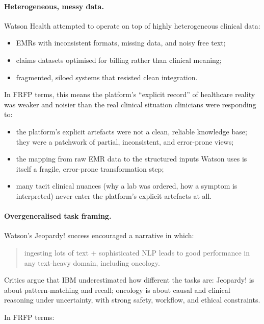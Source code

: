 \paragraph{Heterogeneous, messy data.}
Watson Health attempted to operate on top of highly heterogeneous clinical
data:

\begin{itemize}
  \item EMRs with inconsistent formats, missing data, and noisy free text;
  \item claims datasets optimised for billing rather than clinical meaning;
  \item fragmented, siloed systems that resisted clean integration.
\end{itemize}

In FRFP terms, this means the platform’s “explicit record” of healthcare reality was weaker and noisier than the real clinical situation clinicians were responding to:

\begin{itemize}
\item the platform’s explicit artefacts were not a clean, reliable knowledge base; they were
        a patchwork of partial, inconsistent, and error-prone views;
  \item the mapping from raw EMR data to the structured inputs Watson uses
        is itself a fragile, error-prone transformation step;
  \item many tacit clinical nuances (why a lab was ordered, how a symptom is
        interpreted) never enter the platform’s explicit artefacts at all.
\end{itemize}

\paragraph{Overgeneralised task framing.}
Watson’s Jeopardy! success encouraged a narrative in which:

\begin{quote}
  ingesting lots of text + sophisticated NLP
  leads to good performance in any text-heavy domain, including oncology.
\end{quote}

Critics argue that IBM underestimated how different the tasks are:
Jeopardy! is about pattern-matching and recall; oncology is about causal
and clinical reasoning under uncertainty, with strong safety, workflow, and
ethical constraints.

In FRFP terms:

